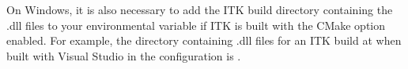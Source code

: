 On Windows, it is also necessary to add the ITK build directory containing the
.dll files to your  environmental variable if ITK is built with the
CMake option  enabled. For example, the directory
containing .dll files for an ITK build at
 when built with Visual Studio in the
 configuration is
.

